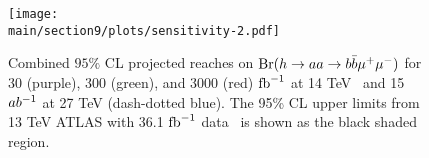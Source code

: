 \begin{figure}[h]
\begin{center}
\texttt{[image: \\main/section9/plots/sensitivity-2.pdf]}
\caption{\small Combined $95\%$ CL projected reaches on ${\mathrm{Br}}(h\to aa \to b\bar{b}\mu^+ \mu^-)$ for 30 (purple), 300 (green), and 3000 (red) ${\rm fb}^{-1}$ at 14 TeV~\cite{Curtin:2014pda} and 15 $ab^{-1}$ at 27 TeV (dash-dotted blue). The 95\% CL upper limits from  13 TeV ATLAS with 36.1 ${\rm fb}^{-1}$ data~\cite{Aaboud:2018esj} is shown as the black shaded region.}
\label{bbmumu}
\end{center}
\end{figure}

